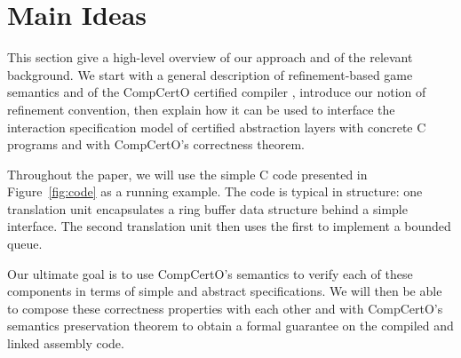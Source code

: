 \documentclass[sigplan,10pt,review,anonymous]{acmart}
\begin{document}
%
%
%



\section{Main Ideas} \label{sec:mainideas} %

This section give a high-level overview
of our approach and of the relevant background.
We start with a general description of
refinement-based game semantics \cite{rbgs-cal}
and of the CompCertO certified compiler \cite{compcerto},
introduce our notion of refinement convention,
then explain how it can be used to interface
the interaction specification model
of certified abstraction layers
with concrete C programs
and with CompCertO's correctness theorem.

Throughout the paper,
we will use the simple C code presented in Figure~\ref{fig:code}
as a running example.
The code is typical in structure:
one translation unit
encapsulates a ring buffer data structure
behind a simple interface.
The second translation unit then uses the first
to implement a bounded queue.

Our ultimate goal is to use CompCertO's semantics
to verify each of these components in terms of
simple and abstract specifications.
We will then be able to compose these correctness properties
with each other and with CompCertO's semantics preservation theorem
to obtain a formal guarantee on the compiled and linked assembly code.
\end{document}
